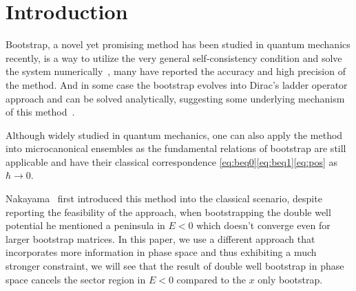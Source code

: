 \documentclass[aps,prl, preprint,amsmath, amssymb]{revtex4-2}
\begin{document}
\maketitle

\section{Introduction}
Bootstrap, a novel yet promising method has been studied in quantum mechanics recently, is a way to utilize the very general self-consistency condition and solve the system numerically~\cite{Han_2020}\cite{Bhattacharya:2021btd}\cite{Berenstein:2021loy}, many have reported the accuracy and high precision of the method. And in some case the bootstrap evolves into Dirac's ladder operator approach and can be solved analytically, suggesting some underlying mechanism of this method~\cite{Aikawa:2021qbl}.

Although widely studied in quantum mechanics, one can also apply the method into microcanonical ensembles as the fundamental relations of bootstrap are still applicable and have their classical correspondence \eqref{eq:beq0}\eqref{eq:beq1}\eqref{eq:pos} as $\hbar \to 0$. 

Nakayama~\cite{Nakayama_2022} first introduced this method into the classical scenario, despite reporting the feasibility of the approach, when bootstrapping the double well potential he mentioned a peninsula in $ E < 0$ which doesn't converge even for larger bootstrap matrices. In this paper, we use a different approach that incorporates more information in phase space and thus exhibiting a much stronger constraint, we will see that the result of double well bootstrap in phase space cancels the sector region in $E < 0$ compared to the $x$ only bootstrap.
\end{document}
